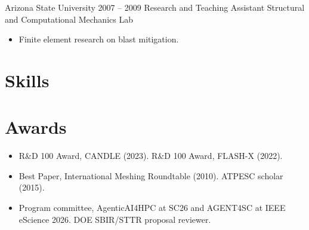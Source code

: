 \documentclass[10pt,letterpaper]{article}
\begin{document}
\entryheader
  {Arizona State University}
  {2007 -- 2009}
  {Research and Teaching Assistant}
  {Structural and Computational Mechanics Lab}
\begin{itemize}
  \item Finite element research on blast mitigation.
\end{itemize}

\section{Skills}

\section{Awards}
\begin{itemize}
  \item R\&D 100 Award, CANDLE (2023). R\&D 100 Award, FLASH-X (2022).
  \item Best Paper, International Meshing Roundtable (2010). ATPESC scholar (2015).
  \item Program committee, AgenticAI4HPC at SC26 and AGENT4SC at IEEE eScience 2026. DOE SBIR/STTR proposal reviewer.
\end{itemize}
\end{document}
